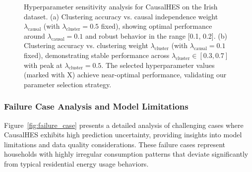 \documentclass[journal]{IEEEtran}
\begin{document}
\begin{figure}[t!]
\centering
{} 
\hfill
{} 
\caption{Hyperparameter sensitivity analysis for CausalHES on the Irish dataset. (a) Clustering accuracy vs. causal independence weight $\lambda_{\text{causal}}$ (with $\lambda_{\text{cluster}}=0.5$ fixed), showing optimal performance around $\lambda_{\text{causal}}=0.1$ and robust behavior in the range [0.1, 0.2]. (b) Clustering accuracy vs. clustering weight $\lambda_{\text{cluster}}$ (with $\lambda_{\text{causal}}=0.1$ fixed), demonstrating stable performance across $\lambda_{\text{cluster}} \in [0.3, 0.7]$ with peak at $\lambda_{\text{cluster}}=0.5$. The selected hyperparameter values (marked with X) achieve near-optimal performance, validating our parameter selection strategy.}
\label{fig:sensitivity_analysis}
\end{figure}

\subsubsection{Failure Case Analysis and Model Limitations}
Figure~\ref{fig:failure_case} presents a detailed analysis of challenging cases where CausalHES exhibits high prediction uncertainty, providing insights into model limitations and data quality considerations. These failure cases represent households with highly irregular consumption patterns that deviate significantly from typical residential energy usage behaviors.
\end{document}
